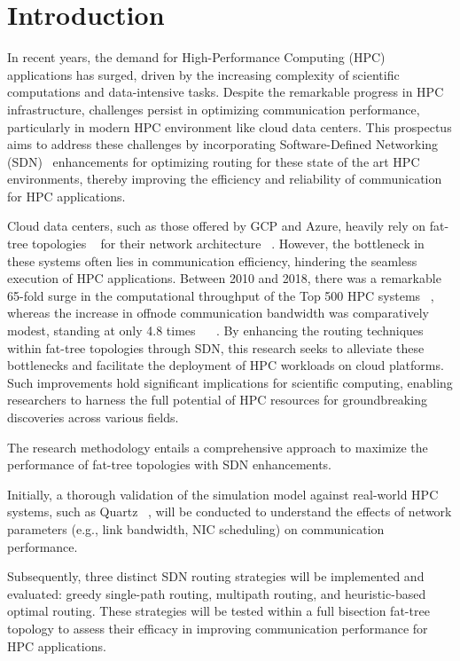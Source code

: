 \chapter{Introduction} 
In recent years, the demand for High-Performance
Computing (HPC) applications has surged, driven by the increasing complexity of
scientific computations and data-intensive tasks. Despite the remarkable
progress in HPC infrastructure, challenges persist in optimizing communication
performance, particularly in modern HPC environment like cloud data centers. 
This prospectus aims to address these challenges by
incorporating Software-Defined Networking (SDN)~\cite{kreutz2014software} enhancements for optimizing routing for these 
state of the art HPC environments, thereby improving the efficiency and reliability of communication
for HPC applications.  

Cloud data centers, such as those offered by GCP and
Azure, heavily rely on fat-tree topologies ~\cite{leiserson1985fat} for their network architecture ~\cite{de2022}.
However, the bottleneck in these systems often lies in communication efficiency,
hindering the seamless execution of HPC applications. 
Between 2010 and 2018, there was a remarkable 65-fold surge in 
the computational throughput of the Top 500 HPC systems ~\cite{t500}, whereas the increase 
in offnode communication bandwidth was comparatively modest, standing at only 4.8 times ~\cite{bergman2018empowering} ~\cite{michelogiannakis2019bandwidth}.
By enhancing the routing
techniques within fat-tree topologies through SDN, this research seeks to
alleviate these bottlenecks and facilitate the deployment of HPC workloads on
cloud platforms. Such improvements hold significant implications for scientific
computing, enabling researchers to harness the full potential of HPC resources
for groundbreaking discoveries across various fields.  

The research methodology
entails a comprehensive approach to maximize the performance of fat-tree
topologies with SDN enhancements. 


Initially, a thorough validation of the
simulation model against real-world HPC systems, such as Quartz ~\cite{quartz}, will be
conducted to understand the effects of network parameters (e.g., link bandwidth,
NIC scheduling) on communication performance. 


Subsequently, three distinct SDN routing strategies will be implemented and evaluated: greedy single-path
routing, multipath routing, and heuristic-based optimal routing. These
strategies will be tested within a full bisection fat-tree topology to assess
their efficacy in improving communication performance for HPC applications.  

